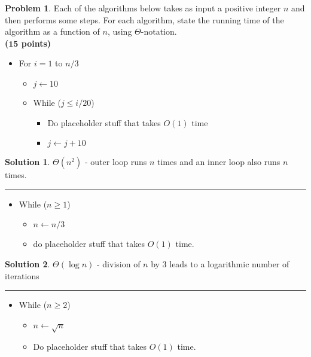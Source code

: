 \documentclass{article}
\theoremstyle{definition}
\newtheorem{problem}{Problem}
\def\fline{\rule{0.75\linewidth}{0.5pt}}
\newcommand{\finishline}{\begin{center}\fline\end{center}}
\newtheorem*{solution*}{Solution}
\newenvironment{solution}{\begin{solution*}}{{\finishline} \end{solution*}}
\newcommand{\grade}[1]{\hfill{\textbf{($\mathbf{#1}$ points)}}}
\begin{document}
\begin{problem}
    Each of the algorithms below takes as input a positive integer $n$ and then performs some steps. For each algorithm, state the running time of the algorithm as a function of $n$, using $\Theta$-notation.\\ \grade{15}

\begin{enumerate}[label =\alph*)]
\item 
\begin{itemize}
	\item For $i = 1$ to $n/3$
	\begin{itemize}
		\item $j \gets 10$
		\item While ($j \leq i/20$)
		\begin{itemize}
			\item Do placeholder stuff that takes $O(1)$ time
			\item $j \gets j + 10$
		\end{itemize}
	\end{itemize}
\end{itemize}

 \begin{solution}
	\item $\Theta(n^2)$ - outer loop runs $n$ times and an inner loop also runs $n$ times.
\end{solution}


\item 

\begin{itemize}
	\item While ($n \geq 1$)
	\begin{itemize}
		\item $n \gets n/3$
		\item do placeholder stuff that takes $O(1)$ time.
	\end{itemize}
\end{itemize}
 \begin{solution}
	\item $\Theta(\log n)$ - division of $n$ by 3 leads to a logarithmic number of iterations
\end{solution}

\item 
\begin{itemize}
\item While ($n \geq 2$)
\begin{itemize}
	\item $n \gets \sqrt{n}$
	\item Do placeholder stuff that takes $O(1)$ time.
\end{itemize}
\end{itemize}


\end{enumerate}
\end{problem}
\end{document}
